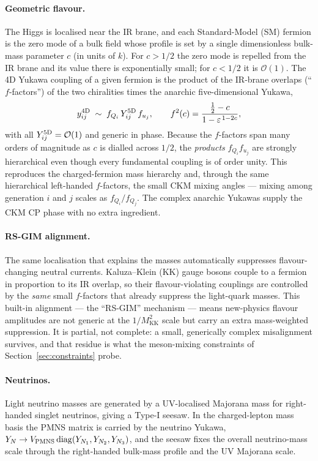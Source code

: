 \documentclass[11pt]{article}
\newcommand{\MKK}{M_{\mathrm{KK}}}
\newcommand{\eps}{\varepsilon}
\begin{document}
\paragraph{Geometric flavour.} The Higgs is localised near the IR brane, and each
Standard-Model (SM) fermion is the zero mode of a bulk field whose profile is set
by a single dimensionless bulk-mass parameter $c$ (in units of $k$). For $c>1/2$
the zero mode is repelled from the IR brane and its value there is exponentially
small; for $c<1/2$ it is $\mathcal{O}(1)$.
The 4D Yukawa coupling of a given fermion is the product of the IR-brane
overlaps (``$f$-factors'') of the two chiralities times the anarchic
five-dimensional Yukawa,
\begin{equation}
y^{\rm 4D}_{ij} \;\sim\; f_{Q_i}\, Y^{\rm 5D}_{ij}\, f_{u_j},
\qquad
f^2(c) = \frac{\tfrac12 - c}{1 - \eps^{\,1-2c}},
\end{equation}
with all $Y^{\rm 5D}_{ij}=\mathcal{O}(1)$ and generic in phase. Because the
$f$-factors span many orders of magnitude as $c$ is dialled across $1/2$, the
\emph{products} $f_{Q_i}f_{u_j}$ are strongly hierarchical even though every
fundamental coupling is of order unity. This reproduces the charged-fermion mass
hierarchy and, through the same hierarchical left-handed $f$-factors, the small
CKM mixing angles --- mixing among generation $i$ and $j$ scales as
$f_{Q_i}/f_{Q_j}$. The complex anarchic Yukawas supply the CKM CP phase with no
extra ingredient.

\paragraph{RS-GIM alignment.} The same localisation that explains the masses
automatically suppresses flavour-changing neutral currents. Kaluza--Klein (KK)
gauge bosons couple to a fermion in proportion to its IR overlap, so their
flavour-violating couplings are controlled by the \emph{same} small $f$-factors
that already suppress the light-quark masses. This built-in alignment --- the
``RS-GIM'' mechanism --- means new-physics flavour amplitudes are not generic at
the $1/\MKK^2$ scale but carry an extra mass-weighted suppression. It is partial,
not complete: a small, generically complex misalignment survives, and that
residue is what the meson-mixing constraints of Section~\ref{sec:constraints}
probe.

\paragraph{Neutrinos.} Light neutrino masses are generated by a UV-localised
Majorana mass for right-handed singlet neutrinos, giving a Type-I seesaw. In the
charged-lepton mass basis the PMNS matrix is carried by the neutrino Yukawa,
$Y_N \to V_{\rm PMNS}\,\mathrm{diag}(Y_{N_1},Y_{N_2},Y_{N_3})$, and the seesaw
fixes the overall neutrino-mass scale through the right-handed bulk-mass profile
and the UV Majorana scale.
\end{document}
